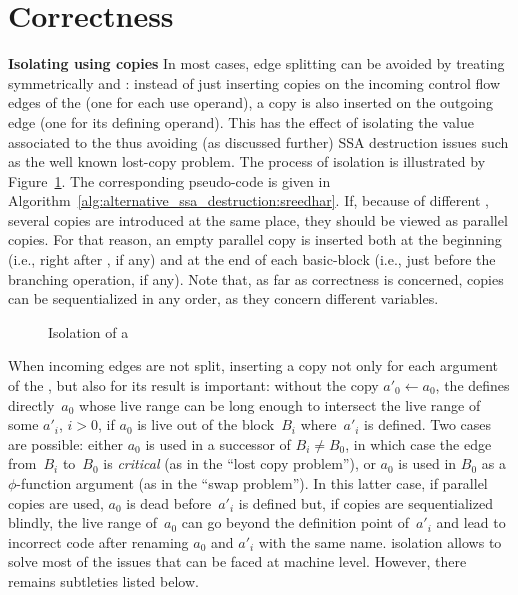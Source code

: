 \section{Correctness}

{\bf Isolating \phinode using copies}
In most cases, edge splitting can be avoided by treating symmetrically \phiuses and \phidef: instead of just inserting copies on the incoming control flow edges of the \phinode (one for each use operand), a copy is also inserted on the outgoing edge (one for its defining operand). This has the effect of isolating the value associated to the \phinode thus avoiding (as discussed further) SSA destruction issues such as the well known lost-copy problem.
The process of \phinode isolation is illustrated by Figure~\ref{fig:phi_isolation}.
The corresponding pseudo-code is given in Algorithm~\ref{alg:alternative_ssa_destruction:sreedhar}. If, because of different \phifuns, several copies are introduced at the
same place, they should be viewed as parallel copies. For that reason, an empty parallel copy is inserted both at the beginning (i.e., right after \phifuns, if any) and at the end of each basic-block (i.e., just before the branching operation, if any).  
Note that, as far as correctness is concerned, copies
can be sequentialized in any order, as they concern different
variables. 

\begin{figure}[h]
\hfill
{}
\caption{Isolation of a \phinode\label{fig:phi_isolation}}
\end{figure}


When incoming edges are not split, inserting a copy not only for each argument of the \phifun, but also for its result is important: without the copy $a'_0\gets a_0$, the \phifun defines
directly~$a_0$ whose live range can be long enough to intersect the live range
of some $a'_i$, $i>0$, if $a_0$ is live out of the block~$B_i$ where~$a'_i$ is
defined. Two cases are possible: either $a_0$ is used in a successor of $B_i
\neq B_0$, in which case the edge from~$B_i$ to~$B_0$ is \emph{critical} (as in
the ``lost copy problem''), or $a_0$ is used in $B_0$ as a $\phi$-function
argument (as in the ``swap problem''). In this latter case, if parallel copies
are used, $a_0$ is dead before~$a'_i$ is defined but, if copies are
sequentialized blindly, the live range of~$a_0$ can go beyond the definition
point of~$a'_i$ and lead to incorrect code after renaming $a_0$ and $a'_i$ with
the same name. \phinode isolation allows to solve most of the issues that can be faced at machine level. However, there remains subtleties listed below.



